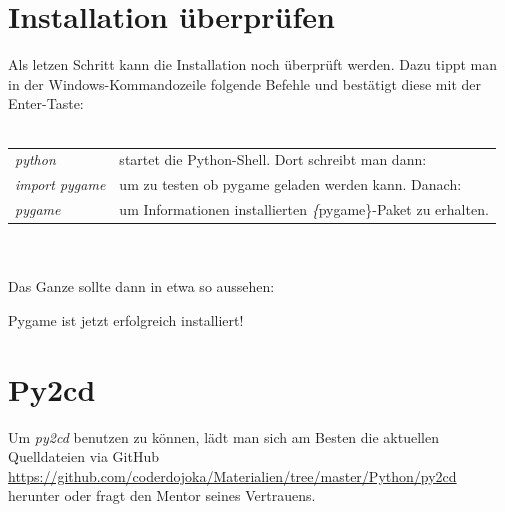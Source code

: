\documentclass[ngerman,oneside, a4letter]{article}
\begin{document}
\section{Installation überprüfen}
Als letzen Schritt kann die Installation noch überprüft werden.
Dazu tippt man in der Windows-Kommandozeile folgende Befehle und bestätigt diese mit der Enter-Taste:
\\
\\
\begin{table}[h]
	\begin{tabular}{ll}

		\emph{python}        & startet die Python-Shell. Dort schreibt man dann:            \\ 
		\emph{import pygame} & um zu testen ob pygame geladen werden kann. Danach:                \\ 
		\emph{pygame}        & um Informationen  installierten \emph\{pygame\}-Paket zu erhalten. \\ 
	\end{tabular}
\end{table}
\\
\\
Das Ganze sollte dann in etwa so aussehen:
\begin{center}
\end{center}
Pygame ist jetzt erfolgreich installiert!

\section{Py2cd}
Um \emph{py2cd} benutzen zu können, lädt man sich am Besten die aktuellen Quelldateien via GitHub \url{https://github.com/coderdojoka/Materialien/tree/master/Python/py2cd} herunter oder fragt den Mentor seines Vertrauens.
\end{document}
